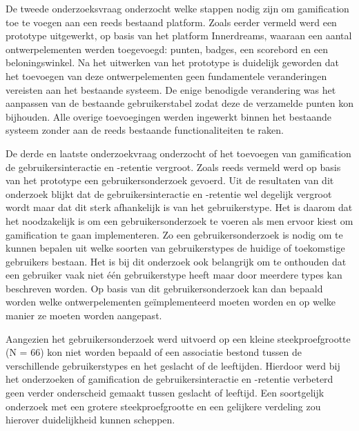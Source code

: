 De tweede onderzoeksvraag onderzocht welke stappen nodig zijn om gamification toe te voegen aan een reeds bestaand platform. Zoals eerder vermeld werd een prototype uitgewerkt, op basis van het platform Innerdreams, waaraan een aantal ontwerpelementen werden toegevoegd: punten, badges, een scorebord en een beloningswinkel. Na het uitwerken van het prototype is duidelijk geworden dat het toevoegen van deze ontwerpelementen geen fundamentele veranderingen vereisten aan het bestaande systeem. De enige benodigde verandering was het aanpassen van de bestaande gebruikerstabel zodat deze de verzamelde punten kon bijhouden. Alle overige toevoegingen werden ingewerkt binnen het bestaande systeem zonder aan de reeds bestaande functionaliteiten te raken.

De derde en laatste onderzoekvraag onderzocht of het toevoegen van gamification de gebruikersinteractie en -retentie vergroot. Zoals reeds vermeld werd op basis van het prototype een gebruikersonderzoek gevoerd. Uit de resultaten van dit onderzoek blijkt dat de gebruikersinteractie en -retentie wel degelijk vergroot wordt maar dat dit sterk afhankelijk is van het gebruikerstype. Het is daarom dat het noodzakelijk is om een gebruikersonderzoek te voeren als men ervoor kiest om gamification te gaan implementeren. Zo een gebruikersonderzoek is nodig om te kunnen bepalen uit welke soorten van gebruikerstypes de huidige of toekomstige gebruikers bestaan. Het is bij dit onderzoek ook belangrijk om te onthouden dat een gebruiker vaak niet één gebruikerstype heeft maar door meerdere types kan beschreven worden. Op basis van dit gebruikersonderzoek kan dan bepaald worden welke ontwerpelementen geïmplementeerd moeten worden en op welke manier ze moeten worden aangepast.

Aangezien het gebruikersonderzoek werd uitvoerd op een kleine steekproefgrootte (N = 66) kon niet worden bepaald of een associatie bestond tussen de verschillende gebruikerstypes en het geslacht of de leeftijden. Hierdoor werd bij het onderzoeken of gamification de gebruikersinteractie en -retentie verbeterd geen verder onderscheid gemaakt tussen geslacht of leeftijd. Een soortgelijk onderzoek met een grotere steekproefgrootte en een gelijkere verdeling zou hierover duidelijkheid kunnen scheppen.


